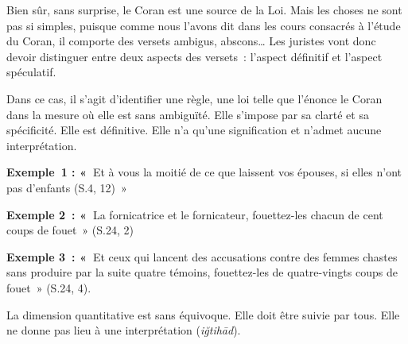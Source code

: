
Bien sûr, sans surprise, le Coran est une source de la Loi. Mais les
choses ne sont pas si simples, puisque comme nous l'avons dit dans les
cours consacrés à l'étude du Coran, il comporte des versets ambigus,
abscons\ldots{} Les juristes vont donc devoir distinguer entre deux
aspects des versets~: l'aspect définitif et l'aspect spéculatif.


Dans ce cas, il s'agit d'identifier une règle, une loi telle que
l'énonce le Coran dans la mesure où elle est sans ambiguïté. Elle
s'impose par sa clarté et sa spécificité. Elle est définitive. Elle n'a
qu'une signification et n'admet aucune interprétation.

\textbf{Exemple~1 : «~}Et à vous la moitié de ce que laissent vos
épouses, si elles n'ont pas d'enfants (S.4, 12)~»


\textbf{Exemple 2~: «~}La fornicatrice et le fornicateur, fouettez-les
chacun de cent coups de fouet~» (S.24, 2)


\textbf{Exemple 3~: «~}Et ceux qui lancent des accusations contre des
femmes chastes sans produire par la suite quatre témoins, fouettez-les
de quatre-vingts coups de fouet~» (S.24, 4).


La dimension quantitative est sans équivoque. Elle doit être suivie par
tous. Elle ne donne pas lieu à une interprétation (\emph{iğtihād}).

